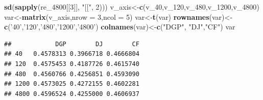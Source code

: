 \documentclass[
]{article}
\newenvironment{Shaded}{\begin{snugshade}}{\end{snugshade}}
\newcommand{\DataTypeTok}[1]{\textcolor[rgb]{0.13,0.29,0.53}{#1}}
\newcommand{\DecValTok}[1]{\textcolor[rgb]{0.00,0.00,0.81}{#1}}
\newcommand{\KeywordTok}[1]{\textcolor[rgb]{0.13,0.29,0.53}{\textbf{#1}}}
\newcommand{\NormalTok}[1]{#1}
\newcommand{\StringTok}[1]{\textcolor[rgb]{0.31,0.60,0.02}{#1}}
\begin{document}
\begin{Shaded}
\begin{Highlighting}[]
        \KeywordTok{sd}\NormalTok{(}\KeywordTok{sapply}\NormalTok{(re_}\DecValTok{4800}\NormalTok{[[}\DecValTok{3}\NormalTok{]], }\StringTok{"[["}\NormalTok{, }\DecValTok{2}\NormalTok{)))}
\NormalTok{v_axis<-}\KeywordTok{c}\NormalTok{(v_}\DecValTok{40}\NormalTok{,v_}\DecValTok{120}\NormalTok{,v_}\DecValTok{480}\NormalTok{,v_}\DecValTok{1200}\NormalTok{,v_}\DecValTok{4800}\NormalTok{)}
\NormalTok{var<-}\KeywordTok{matrix}\NormalTok{(v_axis,}\DataTypeTok{nrow =} \DecValTok{3}\NormalTok{,}\DataTypeTok{ncol =} \DecValTok{5}\NormalTok{)}
\NormalTok{var<-}\KeywordTok{t}\NormalTok{(var)}
\KeywordTok{rownames}\NormalTok{(var)<-}\KeywordTok{c}\NormalTok{(}\StringTok{'40'}\NormalTok{,}\StringTok{'120'}\NormalTok{,}\StringTok{'480'}\NormalTok{,}\StringTok{'1200'}\NormalTok{,}\StringTok{'4800'}\NormalTok{)}
\KeywordTok{colnames}\NormalTok{(var)<-}\KeywordTok{c}\NormalTok{(}\StringTok{"DGP"}\NormalTok{, }\StringTok{"DJ"}\NormalTok{,}\StringTok{"CF"}\NormalTok{)}
\NormalTok{var}
\end{Highlighting}
\end{Shaded}

\begin{verbatim}
##            DGP        DJ        CF
## 40   0.4578313 0.3966718 0.4666804
## 120  0.4575453 0.4187726 0.4615740
## 480  0.4560766 0.4256851 0.4593090
## 1200 0.4573025 0.4272155 0.4602281
## 4800 0.4596524 0.4255000 0.4606937
\end{verbatim}
\end{document}
